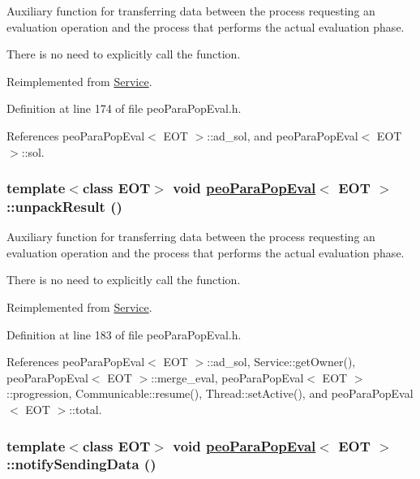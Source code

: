 Auxiliary function for transferring data between the process requesting an evaluation operation and the process that performs the actual evaluation phase. 

There is no need to explicitly call the function. 

Reimplemented from \hyperlink{classService_e5e4f90b2315e15c2a2913bd370f4cf5}{Service}.

Definition at line 174 of file peo\-Para\-Pop\-Eval.h.

References peo\-Para\-Pop\-Eval$<$ EOT $>$::ad\_\-sol, and peo\-Para\-Pop\-Eval$<$ EOT $>$::sol.\hypertarget{classpeoParaPopEval_fd7f0afe9cba30be39269d16097e190e}{
\subsubsection[unpackResult]{\setlength{\rightskip}{0pt plus 5cm}template$<$class EOT$>$ void \hyperlink{classpeoParaPopEval}{peo\-Para\-Pop\-Eval}$<$ EOT $>$::unpack\-Result ()}}
\label{classpeoParaPopEval_fd7f0afe9cba30be39269d16097e190e}


Auxiliary function for transferring data between the process requesting an evaluation operation and the process that performs the actual evaluation phase. 

There is no need to explicitly call the function. 

Reimplemented from \hyperlink{classService_45c06344edbfa482b91f68e2035a6099}{Service}.

Definition at line 183 of file peo\-Para\-Pop\-Eval.h.

References peo\-Para\-Pop\-Eval$<$ EOT $>$::ad\_\-sol, Service::get\-Owner(), peo\-Para\-Pop\-Eval$<$ EOT $>$::merge\_\-eval, peo\-Para\-Pop\-Eval$<$ EOT $>$::progression, Communicable::resume(), Thread::set\-Active(), and peo\-Para\-Pop\-Eval$<$ EOT $>$::total.\hypertarget{classpeoParaPopEval_1f78c3cec2940af08a059cc1aa96a9c8}{
\subsubsection[notifySendingData]{\setlength{\rightskip}{0pt plus 5cm}template$<$class EOT$>$ void \hyperlink{classpeoParaPopEval}{peo\-Para\-Pop\-Eval}$<$ EOT $>$::notify\-Sending\-Data ()}}
\label{classpeoParaPopEval_1f78c3cec2940af08a059cc1aa96a9c8}


